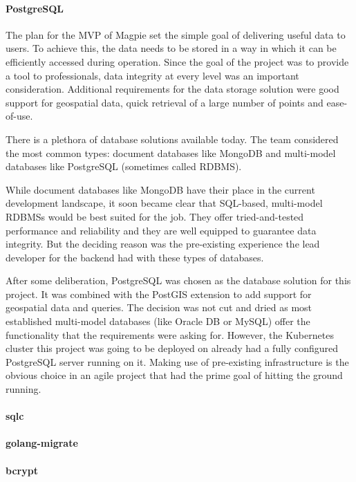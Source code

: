 \paragraph{PostgreSQL}
The plan for the MVP of Magpie set the simple goal of delivering useful data to
users. To achieve this, the data needs to be stored in a way in which it can be
efficiently accessed during operation. Since the goal of the project was to
provide a tool to professionals, data integrity at every level was an important
consideration. Additional requirements for the data storage solution were good
support for geospatial data, quick retrieval of a large number of points and
ease-of-use.

There is a plethora of database solutions available today. The team considered
the most common types: document databases like MongoDB and multi-model databases
like PostgreSQL (sometimes called RDBMS).

While document databases like MongoDB have their place in the current
development landscape, it soon became clear that SQL-based, multi-model RDBMSs
would be best suited for the job. They offer tried-and-tested performance and
reliability and they are well equipped to guarantee data integrity. But the
deciding reason was the pre-existing experience the lead developer for the
backend had with these types of databases.

After some deliberation, PostgreSQL was chosen as the database solution for this
project. It was combined with the PostGIS extension to add support for
geospatial data and queries. The decision was not cut and dried as most
established multi-model databases (like Oracle DB or MySQL) offer the
functionality that the requirements were asking for. However, the Kubernetes
cluster this project was going to be deployed on already had a fully configured
PostgreSQL server running on it. Making use of pre-existing infrastructure is
the obvious choice in an agile project that had the prime goal of hitting the
ground running.

\paragraph{sqlc}
\paragraph{golang-migrate}


\paragraph{bcrypt}

